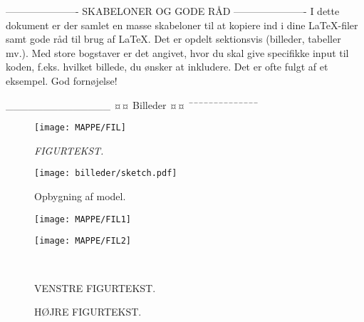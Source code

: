 

----------------------
SKABELONER OG GODE RÅD
----------------------
I dette dokument er der samlet en masse skabeloner til at kopiere ind i dine LaTeX-filer samt gode råd til brug af LaTeX. Det er opdelt sektionsvis (billeder, tabeller mv.). Med store bogstaver er det angivet, hvor du skal give specifikke input til koden, f.eks. hvilket billede, du ønsker at inkludere. Det er ofte fulgt af et eksempel. God fornøjelse!

______________
¤¤ Billeder ¤¤
¯¯¯¯¯¯¯¯¯¯¯¯¯¯

\begin{figure}[htbp] %
	\centering
	\texttt{[image: MAPPE/FIL]}
	\caption{\textit{FIGURTEKST.}}
	\label{fig:LABEL}
\end{figure}

\begin{figure}[H]
	\centering
	\texttt{[image: billeder/sketch.pdf]}
	\caption{Opbygning af model.}
	\label{fig:sketch}
\end{figure}

\begin{figure}[H]
	\centering
	\begin{minipage}[b]{0.48\textwidth}
	\centering
	\texttt{[image: MAPPE/FIL1]} %
	\end{minipage}
	\hfill
	\begin{minipage}[b]{0.48\textwidth}
	\centering
	\texttt{[image: MAPPE/FIL2]} %
	\end{minipage}
	\\ %
	\begin{minipage}[t]{0.48\textwidth}
	\caption{VENSTRE FIGURTEKST.} %
	\label{fig:LABEL1}
	\end{minipage}
	\hfill
	\begin{minipage}[t]{0.48\textwidth}
	\caption{HØJRE FIGURTEKST.} %
	\label{fig:LABEL2}
	\end{minipage}
\end{figure}

